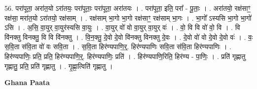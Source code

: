 \documentclass[17pt]{extarticle}
\begin{document}
56. परा॑पूता॒ अरा॑त॒यो ऽरा॑तयः॒ परा॑पूताः॒ परा॑पूता॒ अरा॑तयः । . परा॑पूता॒ इति॒ परा᳚ - पू॒ताः॒ । . अरा॑तयो॒ रक्ष॑साꣳ॒॒ रक्ष॑सा॒ मरा॑त॒यो ऽरा॑तयो॒ रक्ष॑साम् । . रक्ष॑साम् भा॒गो भा॒गो रक्ष॑साꣳ॒॒ रक्ष॑साम् भा॒गः । . भा॒गो᳚ ऽस्यसि भा॒गो भा॒गो॑ ऽसि । . अ॒सि॒ वा॒युर् वा॒युर॑स्यसि वा॒युः । . वा॒युर् वो॑ वो वा॒युर् वा॒युर् वः॑ । . वो॒ वि वि वो॑ वो॒ वि । . वि वि॑नक्तु विनक्तु॒ वि वि वि॑नक्तु । . वि॒न॒क्तु॒ दे॒वो दे॒वो वि॑नक्तु विनक्तु दे॒वः । . दे॒वो वो॑ वो दे॒वो दे॒वो वः॑ । . वः॒ स॒वि॒ता स॑वि॒ता वो॑ वः सवि॒ता । . स॒वि॒ता हिर॑ण्यपाणि॒र्॒. हिर॑ण्यपाणिः सवि॒ता स॑वि॒ता हिर॑ण्यपाणिः । . हिर॑ण्यपाणिः॒ प्रति॒ प्रति॒ हिर॑ण्यपाणि॒र्॒. हिर॑ण्यपाणिः॒ प्रति॑ । . हिर॑ण्यपाणि॒रिति॒ हिर॑ण्य - पा॒णिः॒ । . प्रति॑ गृह्णातु गृह्णातु॒ प्रति॒ प्रति॑ गृह्णातु । . गृ॒ह्णा॒त्विति॑ गृह्णातु । \newline

\textbf{Ghana Paata } \newline
\end{document}
